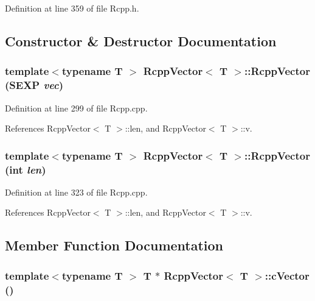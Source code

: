 Definition at line 359 of file Rcpp.h.

\subsection{Constructor \& Destructor Documentation}
\hypertarget{classRcppVector_0925b350f636a546e58ad0329786500a}{
\subsubsection[{RcppVector}]{\setlength{\rightskip}{0pt plus 5cm}template$<$typename T $>$ {\bf RcppVector}$<$ T $>$::{\bf RcppVector} (SEXP {\em vec})}}
\label{classRcppVector_0925b350f636a546e58ad0329786500a}




Definition at line 299 of file Rcpp.cpp.

References RcppVector$<$ T $>$::len, and RcppVector$<$ T $>$::v.\hypertarget{classRcppVector_eb7797ca2b2ac2d03fee0a543993f17b}{
\subsubsection[{RcppVector}]{\setlength{\rightskip}{0pt plus 5cm}template$<$typename T $>$ {\bf RcppVector}$<$ T $>$::{\bf RcppVector} (int {\em len})}}
\label{classRcppVector_eb7797ca2b2ac2d03fee0a543993f17b}




Definition at line 323 of file Rcpp.cpp.

References RcppVector$<$ T $>$::len, and RcppVector$<$ T $>$::v.

\subsection{Member Function Documentation}
\hypertarget{classRcppVector_f4660a27a888a51693b02d2f51b47b08}{
\subsubsection[{cVector}]{\setlength{\rightskip}{0pt plus 5cm}template$<$typename T $>$ T $\ast$ {\bf RcppVector}$<$ T $>$::cVector ()}}
\label{classRcppVector_f4660a27a888a51693b02d2f51b47b08}




